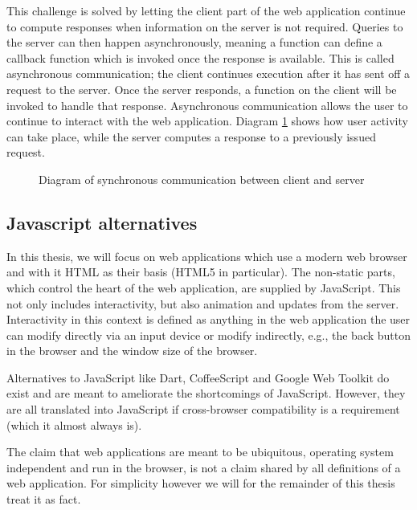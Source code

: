 \documentclass[thesis.tex]{subfiles}
\begin{document}
This challenge is solved by letting the client part of the web application
continue to compute responses when information on the server is not required.
Queries to the server can then happen asynchronously, meaning a function can
define a callback function which is invoked once the response is available. This
is called asynchronous communication; the client continues execution after it
has sent off a request to the server. Once the server responds, a function on
the client will be invoked to handle that response.
Asynchronous communication allows the user to continue to interact with the
web application. Diagram \ref{fig:asynchronous} shows how user activity can
take place, while the server computes a response to a previously issued request.

\begin{figure}
	\centering
	
	\caption{Diagram of synchronous communication between client and server}
	\label{fig:asynchronous}
\end{figure}

\subsection{Javascript alternatives}
In this thesis, we will focus on web applications which use a
modern web browser and with it HTML as their basis (HTML5 in particular).
The non-static parts, which control the heart of the web application,
are supplied by JavaScript. This not only includes interactivity, but also
animation and updates from the server.\\
Interactivity in this context is defined as anything in the web application
the user can modify directly via an input device or modify indirectly, e.g.,
the back button in the browser and the window size of the browser.

Alternatives to JavaScript like Dart, CoffeeScript and Google Web Toolkit
do exist and are meant to ameliorate the shortcomings of JavaScript. 
However, they are all translated into JavaScript if cross-browser
compatibility is a requirement (which it almost always is).

The claim that web applications are meant to be ubiquitous,
operating system independent and run in the browser, is not a claim shared
by all definitions of a web application. For simplicity however we will for the
remainder of this thesis treat it as fact.
\end{document}
